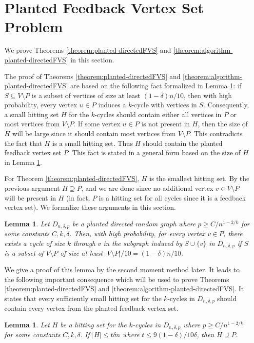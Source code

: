 \documentclass[11pt]{article}
\newtheorem{lemma}[theorem]{Lemma}
\begin{document}
\section{Planted Feedback Vertex Set Problem}
We prove Theorems \ref{theorem:planted-directedFVS} and \ref{theorem:algorithm-planted-directedFVS} in this section.

The proof of Theorems \ref{theorem:planted-directedFVS} and \ref{theorem:algorithm-planted-directedFVS} are based on the following fact formalized in Lemma \ref{lemma:cycle-through-every-vertex}: if $S\subseteq V\setminus P$ is a subset of vertices of size at least $(1-\delta)n/10$, then with high probability, every vertex $u\in P$ induces a $k$-cycle with vertices in $S$. Consequently, a small hitting set $H$ for the $k$-cycles should contain either all vertices in $P$ or most vertices from $V\setminus P$. If some vertex $u\in P$ is not present in $H$, then the size of $H$ will be large since it should contain most vertices from $V\setminus P$. This contradicts the fact that $H$ is a small hitting set. Thus $H$ should contain the planted feedback vertex set $P$. This fact is stated in a general form based on the size of $H$ in Lemma \ref{lemma:small-hitting-set-contains-P}.

For Theorem \ref{theorem:planted-directedFVS}, $H$ is the smallest hitting set. By the previous argument $H\supseteq P$, and we are done since no additional vertex $v\in V\setminus P$ will be present in $H$ (in fact, $P$ is a hitting set for all cycles since it is a feedback vertex set). We formalize these arguments in this section.

\begin{lemma}\label{lemma:cycle-through-every-vertex}
Let $D_{n,\delta,p}$ be a planted directed random graph where $p\geq C/n^{1-2/k}$ for some constants $C,k,\delta$. Then, with high probability, for every vertex $v\in P$, there exists a cycle of size $k$ through $v$ in the subgraph induced by $S\cup \{v\}$ in $D_{n,\delta,p}$ if $S$ is a subset of $V\setminus P$ of size at least $|V\setminus P|/10=(1-\delta)n/10$.
\end{lemma}

We give a proof of this lemma by the second moment method later. It leads to the following important consequence which will be used to prove Theorems \ref{theorem:planted-directedFVS} and \ref{theorem:algorithm-planted-directedFVS}. It states that every sufficiently small hitting set for the $k$-cycles in $D_{n,\delta,p}$ should contain every vertex from the planted feedback vertex set.
\begin{lemma}\label{lemma:small-hitting-set-contains-P}
Let $H$ be a hitting set for the $k$-cycles in $D_{n,\delta,p}$ where $p\geq C/n^{1-2/k}$ for some constants $C,k,\delta$. If $|H|\leq t\delta n$ where $t\leq 9(1-\delta)/10\delta$, then $H\supseteq P$.
\end{lemma}
\end{document}
